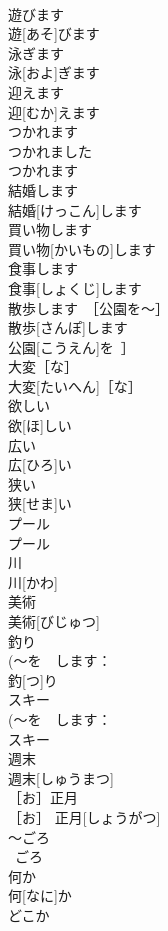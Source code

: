 \documentclass[8pt]{extreport}
\begin{document}
\begin{CJK}{UTF8}{min}
\\	遊びます	
\\	遊[あそ]びます	
\\	泳ぎます	
\\	泳[およ]ぎます	
\\	迎えます	
\\	迎[むか]えます	
\\	つかれます	
\\	つかれました 
\\	つかれます	
\\	結婚します	
\\	結婚[けっこん]します	
\\	買い物します	
\\	買い物[かいもの]します	
\\	食事します	
\\	食事[しょくじ]します	
\\	散歩します　［公園を～］	
\\	散歩[さんぽ]します　
\\	公園[こうえん]を~］	
\\	大変［な］	
\\	大変[たいへん]［な］	
\\	欲しい	
\\	欲[ほ]しい	
\\	広い	
\\	広[ひろ]い	
\\	狭い	
\\	狭[せま]い	
\\	プール	
\\	プール	
\\	川	
\\	川[かわ]	
\\	美術	
\\	美術[びじゅつ]	
\\	釣り	
\\	(～を　します：
\\	釣[つ]り	
\\	スキー	
\\	(～を　します：
\\	スキー	
\\	週末	
\\	週末[しゅうまつ]	
\\	［お］正月	
\\	［お］ 正月[しょうがつ]	
\\	～ごろ	
\\	~ごろ	
\\	何か	
\\	何[なに]か	
\\	どこか	

\end{CJK}
\end{document}
